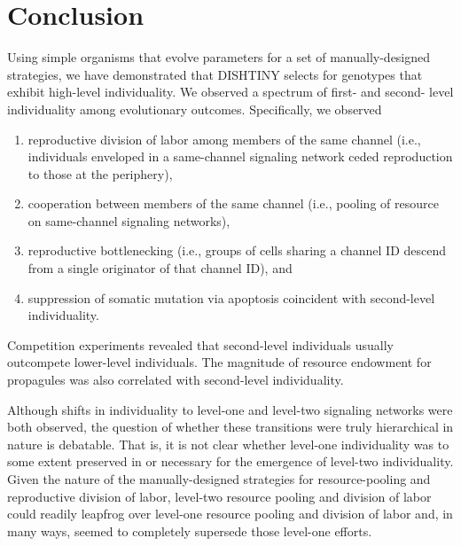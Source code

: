 \section{Conclusion}

Using simple organisms that evolve parameters for a set of manually-designed strategies, we have demonstrated that DISHTINY selects for genotypes that exhibit high-level individuality.
We observed a spectrum of first- and second- level individuality among evolutionary outcomes.
Specifically, we observed
\begin{enumerate}
  \item reproductive division of labor among members of the same channel (i.e., individuals enveloped in a same-channel signaling network ceded reproduction to those at the periphery),
  \item cooperation between members of the same channel (i.e., pooling of resource on same-channel signaling networks),
  \item reproductive bottlenecking (i.e., groups of cells sharing a channel ID descend from a single originator of that channel ID), and
  \item suppression of somatic mutation via apoptosis coincident with second-level individuality.
\end{enumerate}

Competition experiments revealed that second-level individuals usually outcompete lower-level individuals.
The magnitude of resource endowment for propagules was also correlated with second-level individuality.

Although shifts in individuality to level-one and level-two signaling networks were both observed, the question of whether these transitions were truly hierarchical in nature is debatable.
That is, it is not clear whether level-one individuality was to some extent preserved in or necessary for the emergence of level-two individuality.
Given the nature of the manually-designed strategies for resource-pooling and reproductive division of labor, level-two resource pooling and division of labor could readily leapfrog over level-one resource pooling and division of labor and, in many ways, seemed to completely supersede those level-one efforts.


